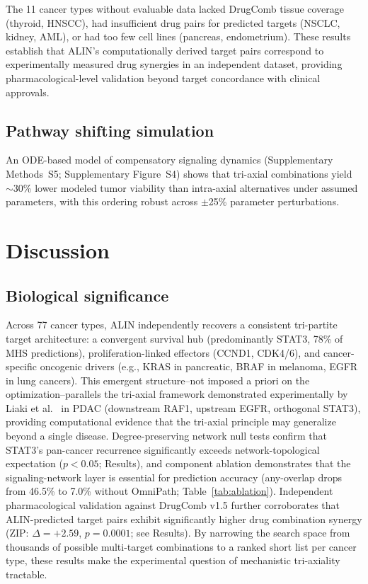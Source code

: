 \documentclass[11pt]{article}
\begin{document}
The 11 cancer types without evaluable data lacked DrugComb tissue coverage (thyroid, HNSCC), had insufficient drug pairs for predicted targets (NSCLC, kidney, AML), or had too few cell lines (pancreas, endometrium). These results establish that ALIN's computationally derived target pairs correspond to experimentally measured drug synergies in an independent dataset, providing pharmacological-level validation beyond target concordance with clinical approvals.

\subsection*{Pathway shifting simulation}
An ODE-based model of compensatory signaling dynamics (Supplementary Methods~S5; Supplementary Figure~S4) shows that tri-axial combinations yield $\sim$30\% lower modeled tumor viability than intra-axial alternatives under assumed parameters, with this ordering robust across $\pm$25\% parameter perturbations.

\section*{Discussion}

\subsection*{Biological significance}
Across 77 cancer types, ALIN independently recovers a consistent tri-partite target architecture: a convergent survival hub (predominantly STAT3, 78\% of MHS predictions), proliferation-linked effectors (CCND1, CDK4/6), and cancer-specific oncogenic drivers (e.g., KRAS in pancreatic, BRAF in melanoma, EGFR in lung cancers). This emergent structure--not imposed a priori on the optimization--parallels the tri-axial framework demonstrated experimentally by Liaki et al.~\cite{Liaki2025} in PDAC (downstream RAF1, upstream EGFR, orthogonal STAT3), providing computational evidence that the tri-axial principle may generalize beyond a single disease. Degree-preserving network null tests confirm that STAT3's pan-cancer recurrence significantly exceeds network-topological expectation ($p < 0.05$; Results), and component ablation demonstrates that the signaling-network layer is essential for prediction accuracy (any-overlap drops from 46.5\% to 7.0\% without OmniPath; Table~\ref{tab:ablation}). Independent pharmacological validation against DrugComb v1.5 further corroborates that ALIN-predicted target pairs exhibit significantly higher drug combination synergy (ZIP: $\Delta = +2.59$, $p = 0.0001$; see Results). By narrowing the search space from thousands of possible multi-target combinations to a ranked short list per cancer type, these results make the experimental question of mechanistic tri-axiality tractable.
\end{document}
